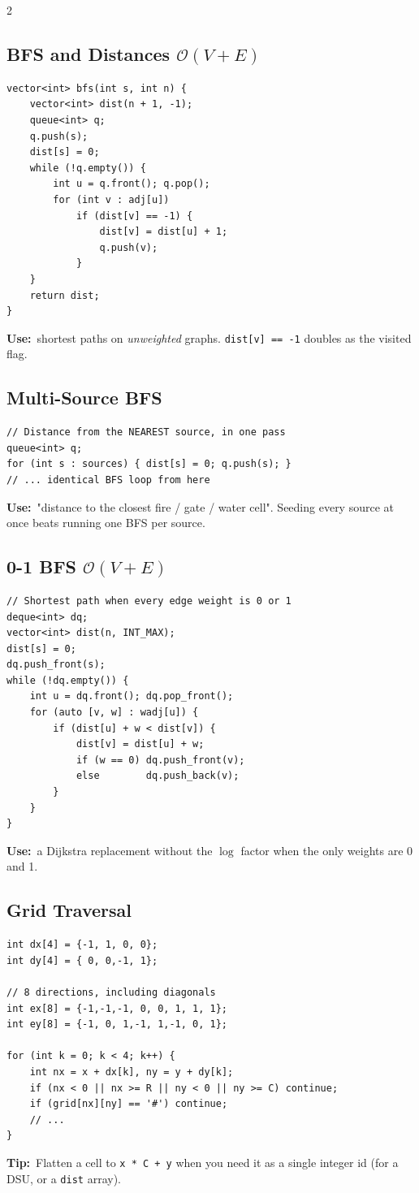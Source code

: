 \documentclass[10pt]{article}
\newcommand{\code}[1]{\texttt{\small #1}}
\newcommand{\sub}[2]{\subsection[#1]{#1\hspace{0.6em}%
  \textnormal{\color{accent2}\small$\mathcal{O}(#2)$}}}
\newcommand{\uses}[1]{{\color{accent2}\footnotesize\textbf{Use:}}~{\footnotesize #1}\par}
\newcommand{\tip}[1]{{\color{tipc}\footnotesize\textbf{Tip:}}~{\footnotesize #1}\par}
\begin{document}
\begin{multicols}{2}
\sub{BFS and Distances}{V + E}
\begin{lstlisting}
vector<int> bfs(int s, int n) {
    vector<int> dist(n + 1, -1);
    queue<int> q;
    q.push(s);
    dist[s] = 0;
    while (!q.empty()) {
        int u = q.front(); q.pop();
        for (int v : adj[u])
            if (dist[v] == -1) {
                dist[v] = dist[u] + 1;
                q.push(v);
            }
    }
    return dist;
}
\end{lstlisting}
\uses{shortest paths on \emph{unweighted} graphs. \code{dist[v] == -1}
doubles as the visited flag.}

\subsection{Multi-Source BFS}
\begin{lstlisting}
// Distance from the NEAREST source, in one pass
queue<int> q;
for (int s : sources) { dist[s] = 0; q.push(s); }
// ... identical BFS loop from here
\end{lstlisting}
\uses{"distance to the closest fire / gate / water cell". Seeding every
source at once beats running one BFS per source.}

\sub{0-1 BFS}{V + E}
\begin{lstlisting}
// Shortest path when every edge weight is 0 or 1
deque<int> dq;
vector<int> dist(n, INT_MAX);
dist[s] = 0;
dq.push_front(s);
while (!dq.empty()) {
    int u = dq.front(); dq.pop_front();
    for (auto [v, w] : wadj[u]) {
        if (dist[u] + w < dist[v]) {
            dist[v] = dist[u] + w;
            if (w == 0) dq.push_front(v);
            else        dq.push_back(v);
        }
    }
}
\end{lstlisting}
\uses{a Dijkstra replacement without the $\log$ factor when the only
weights are 0 and 1.}

\subsection{Grid Traversal}
\begin{lstlisting}
int dx[4] = {-1, 1, 0, 0};
int dy[4] = { 0, 0,-1, 1};

// 8 directions, including diagonals
int ex[8] = {-1,-1,-1, 0, 0, 1, 1, 1};
int ey[8] = {-1, 0, 1,-1, 1,-1, 0, 1};

for (int k = 0; k < 4; k++) {
    int nx = x + dx[k], ny = y + dy[k];
    if (nx < 0 || nx >= R || ny < 0 || ny >= C) continue;
    if (grid[nx][ny] == '#') continue;
    // ...
}
\end{lstlisting}
\tip{Flatten a cell to \code{x * C + y} when you need it as a single
integer id (for a DSU, or a \code{dist} array).}


\end{multicols}
\end{document}
